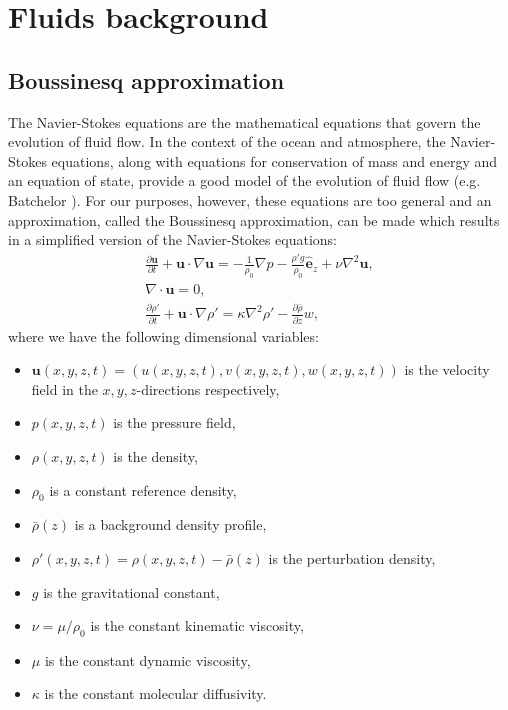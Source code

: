 \chapter{Fluids background}
\section{Boussinesq approximation}

The Navier-Stokes equations are the mathematical equations that govern the evolution of fluid flow. In the context of the ocean and atmosphere, the Navier-Stokes equations, along with equations for conservation of mass and energy and an equation of state, provide a good model of the evolution of fluid flow (e.g. Batchelor \cite{batchelor}). For our purposes, however, these equations are too general and an approximation, called the Boussinesq approximation, can be made which results in a simplified version of the Navier-Stokes equations:  
\begin{align} 
\frac{\partial \bm{u}}{\partial t} + \bm{u}\cdot \nabla \bm{u} = -\frac{1}{\rho_{0}}\nabla p - \frac{\rho' g}{\rho_{0}}\hat{\bm{e}}_{z} + \nu \nabla^{2}\bm{u} \label{boussinesq1},\\
\nabla \cdot \bm{u} =0 \label{boussinesq2},\\
\frac{\partial \rho'}{\partial t} + \bm{u}\cdot \nabla \rho' = \kappa \nabla^{2}\rho' - \frac{\partial \bar{\rho}}{\partial z} w,\label{boussinesq3}
\end{align}
where we have the following dimensional variables:
\begin{itemize}
\item $\textbf{u}(x,y,z,t)=(u(x,y,z,t),v(x,y,z,t),w(x,y,z,t))$ is the velocity field in the $x,y,z$-directions respectively,
\item $p(x,y,z,t)$ is the pressure field,
\item $\rho(x,y,z,t)$ is the density,
\item $\rho_{0}$ is a constant reference density,
\item $\bar{\rho}(z)$ is a background density profile,
\item $\rho'(x,y,z,t)=\rho(x,y,z,t)-\bar{\rho}(z)$ is the perturbation density,
\item $g$ is the gravitational constant,
\item $\nu=\mu/\rho_{0}$ is the constant kinematic viscosity,
\item $\mu$ is the constant dynamic viscosity,
\item $\kappa$ is the constant molecular diffusivity.
\end{itemize}
